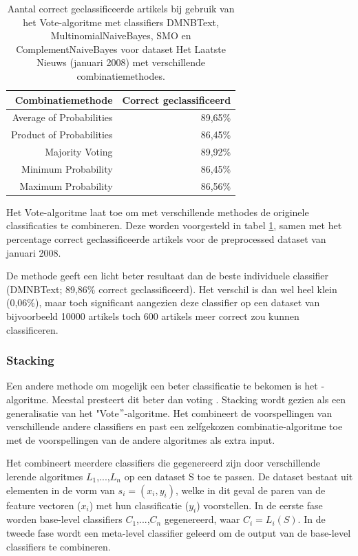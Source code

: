 \begin{table}[htbp]
	\centering
	\caption{Aantal correct geclassificeerde artikels bij gebruik van het Vote-algoritme met classifiers DMNBText, MultinomialNaiveBayes, SMO en ComplementNaiveBayes voor dataset Het Laatste Nieuws (januari 2008) met verschillende combinatiemethodes.}
	\begin{tabular}{rr}
		\toprule
		Combinatiemethode & Correct geclassificeerd \\
		\midrule
		Average of Probabilities & 89,65\% \\
		Product of Probabilities & 86,45\% \\
		Majority Voting & 89,92\% \\
		Minimum Probability & 86,45\% \\
		Maximum Probability & 86,56\% \\
		\bottomrule
	\end{tabular}%
	\label{tab:vote}%
\end{table}%

Het Vote-algoritme laat toe om met verschillende methodes de originele classificaties te combineren. Deze worden voorgesteld in tabel \ref{tab:vote}, samen met het percentage correct geclassificeerde artikels voor de preprocessed dataset van januari 2008.

De methode  geeft een licht beter resultaat dan de beste individuele classifier (DMNBText; 89,86\% correct geclassificeerd). Het verschil is dan wel heel klein (0,06\%), maar toch significant aangezien deze classifier op een dataset van bijvoorbeeld 10000 artikels toch 600 artikels meer correct zou kunnen classificeren. 

\subsubsection{Stacking}\label{stacking}
Een andere methode om mogelijk een beter classificatie te bekomen is het -algoritme. Meestal presteert dit beter dan voting \cite{Sigletos2005}. Stacking wordt gezien als een generalisatie van het "Vote$"$-algoritme. Het combineert de voorspellingen van verschillende andere classifiers en past een zelfgekozen combinatie-algoritme toe met de voorspellingen van de andere algoritmes als extra input. 

Het combineert meerdere classifiers die gegenereerd zijn door verschillende lerende algoritmes $L_1$,...,$L_n$ op een dataset S toe te passen. De dataset bestaat uit elementen in de vorm van $s_i = (x_i, y_i)$, welke in dit geval de paren van de feature vectoren ($x_i$) met hun classificatie ($y_i$) voorstellen. In de eerste fase worden base-level classifiers $C_1$,...,$C_n$ gegenereerd, waar $C_i = L_{i}(S)$. In de tweede fase wordt een meta-level classifier geleerd om de output van de base-level classifiers te combineren.


